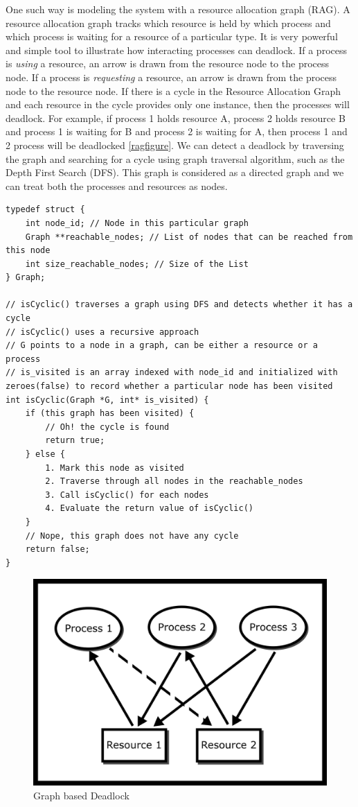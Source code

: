 One such way is modeling the system with a resource allocation graph (\gls{RAG}).
A resource allocation graph tracks which resource is held by which process and which process is waiting for a resource of a particular type.
It is very powerful and simple tool to illustrate how interacting processes can deadlock.
If a process is \emph{using} a resource, an arrow is drawn from the resource node to the process node.
If a process is \emph{requesting} a resource, an arrow is drawn from the process node to the resource node.
If there is a cycle in the Resource Allocation Graph and each resource in the cycle provides only one instance, then the processes will deadlock.
For example, if process 1 holds resource A, process 2 holds resource B and process 1 is waiting for B and process 2 is waiting for A, then process 1 and 2 process will be deadlocked \ref{ragfigure}.
We can detect a deadlock by traversing the graph and searching for a cycle using graph traversal algorithm, such as the Depth First Search (DFS).
This graph is considered as a directed graph and we can treat both the processes and resources as nodes.

\begin{verbatim}
typedef struct {
	int node_id; // Node in this particular graph
	Graph **reachable_nodes; // List of nodes that can be reached from this node
	int size_reachable_nodes; // Size of the List
} Graph;

// isCyclic() traverses a graph using DFS and detects whether it has a cycle
// isCyclic() uses a recursive approach
// G points to a node in a graph, can be either a resource or a process
// is_visited is an array indexed with node_id and initialized with zeroes(false) to record whether a particular node has been visited
int isCyclic(Graph *G, int* is_visited) {
	if (this graph has been visited) {
		// Oh! the cycle is found
		return true;
	} else {
		1. Mark this node as visited
		2. Traverse through all nodes in the reachable_nodes
		3. Call isCyclic() for each nodes
		4. Evaluate the return value of isCyclic()
	}
	// Nope, this graph does not have any cycle
	return false;
}
\end{verbatim}

\begin{figure}[H]
\centering
\includegraphics[width=.5\textwidth]{deadlock/drawings/deadlock.png}
\caption{Graph based Deadlock}
\end{figure}

